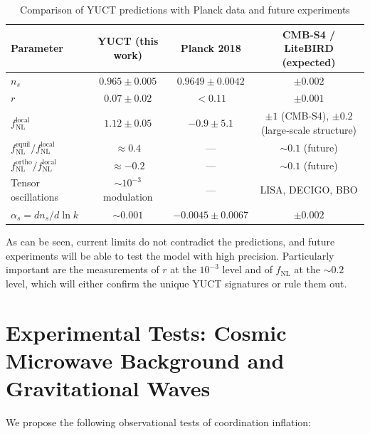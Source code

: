 \documentclass[12pt]{article}
\theoremstyle{remark}
\newcommand{\rs}{r}
\begin{document}
	\begin{table}[htbp]
		\centering
		\caption{Comparison of YUCT predictions with Planck data and future experiments}
		\label{tab:comparison}
		\begin{tabular}{lccc}
			\toprule
			\textbf{Parameter} & \textbf{YUCT (this work)} & \textbf{Planck 2018} & \textbf{CMB‑S4 / LiteBIRD (expected)} \\
			\midrule
			$n_s$ & $0.965 \pm 0.005$ & $0.9649 \pm 0.0042$ & $\pm 0.002$ \\
			$\rs$ & $0.07 \pm 0.02$ & $<0.11$ & $\pm 0.001$ \\
			$f_{\mathrm{NL}}^{\mathrm{local}}$ & $1.12 \pm 0.05$ & $-0.9 \pm 5.1$ & $\pm 1$ (CMB‑S4), $\pm 0.2$ (large‑scale structure) \\
			$f_{\mathrm{NL}}^{\mathrm{equil}} / f_{\mathrm{NL}}^{\mathrm{local}}$ & $\approx 0.4$ & — & $\sim 0.1$ (future) \\
			$f_{\mathrm{NL}}^{\mathrm{ortho}} / f_{\mathrm{NL}}^{\mathrm{local}}$ & $\approx -0.2$ & — & $\sim 0.1$ (future) \\
			Tensor oscillations & $ \sim 10^{-3}$ modulation & — & LISA, DECIGO, BBO \\
			$\alpha_s = dn_s/d\ln k$ & $\sim 0.001$ & $-0.0045 \pm 0.0067$ & $\pm 0.002$ \\
			\bottomrule
		\end{tabular}
	\end{table}
	
	As can be seen, current limits do not contradict the predictions, and future experiments will be able to test the model with high precision. Particularly important are the measurements of $r$ at the $10^{-3}$ level and of $f_{\text{NL}}$ at the $\sim 0.2$ level, which will either confirm the unique YUCT signatures or rule them out.
	
	\section{Experimental Tests: Cosmic Microwave Background and Gravitational Waves}
	\label{sec:tests}
	
	We propose the following observational tests of coordination inflation:
	
\end{document}
